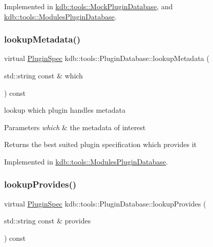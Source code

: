 Implemented in \hyperlink{classkdb_1_1tools_1_1MockPluginDatabase_ae352c27aa51bc8c2ea8c708d14f6fc76}{kdb\+::tools\+::\+Mock\+Plugin\+Database}, and \hyperlink{classkdb_1_1tools_1_1ModulesPluginDatabase_a3f51beee8aecb4371e7d12e98958f875}{kdb\+::tools\+::\+Modules\+Plugin\+Database}.

\mbox{\label{classkdb_1_1tools_1_1PluginDatabase_a03a416f66d6525f46929e5a68d9db3f7}} 
\subsubsection{\texorpdfstring{lookup\+Metadata()}{lookupMetadata()}}
{\footnotesize\ttfamily virtual \hyperlink{classkdb_1_1tools_1_1PluginSpec}{Plugin\+Spec} kdb\+::tools\+::\+Plugin\+Database\+::lookup\+Metadata (\begin{DoxyParamCaption}\item[{std\+::string const \&}]{which }\end{DoxyParamCaption}) const\hspace{0.3cm}{\ttfamily [pure virtual]}}



lookup which plugin handles metadata 


\begin{DoxyParams}{Parameters}
{\em which} & the metadata of interest\\
\hline
\end{DoxyParams}
\begin{DoxyReturn}{Returns}
the best suited plugin specification which provides it 
\end{DoxyReturn}


Implemented in \hyperlink{classkdb_1_1tools_1_1ModulesPluginDatabase_aa7f244f0271ea9b2a3f5b52779167f55}{kdb\+::tools\+::\+Modules\+Plugin\+Database}.

\mbox{\label{classkdb_1_1tools_1_1PluginDatabase_a43abe56a024218ecee48526ced699f05}} 
\subsubsection{\texorpdfstring{lookup\+Provides()}{lookupProvides()}}
{\footnotesize\ttfamily virtual \hyperlink{classkdb_1_1tools_1_1PluginSpec}{Plugin\+Spec} kdb\+::tools\+::\+Plugin\+Database\+::lookup\+Provides (\begin{DoxyParamCaption}\item[{std\+::string const \&}]{provides }\end{DoxyParamCaption}) const\hspace{0.3cm}{\ttfamily [pure virtual]}}




